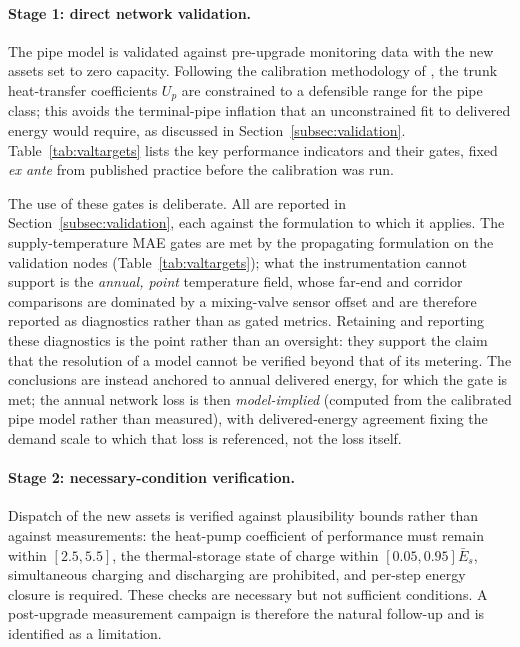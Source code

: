 \documentclass[a4paper,fleqn]{cas-sc}
\begin{document}
\paragraph{Stage 1: direct network validation.}
The pipe model is validated against pre-upgrade monitoring data with the new assets set to
zero capacity. Following the calibration methodology of \citet{Maldonado2024}, the trunk
heat-transfer coefficients $U_p$ are constrained to a defensible range for the pipe class;
this avoids the terminal-pipe inflation that an unconstrained fit to delivered energy would
require, as discussed in Section~\ref{subsec:validation}. Table~\ref{tab:valtargets} lists
the key performance indicators and their gates, fixed \emph{ex ante} from published practice
before the calibration was run.

The use of these gates is deliberate. All are reported in
Section~\ref{subsec:validation}, each against the formulation to which it applies. The
supply-temperature MAE gates are met by the propagating formulation on the validation nodes
(Table~\ref{tab:valtargets}); what the instrumentation cannot support is the \emph{annual,
point} temperature field, whose far-end and corridor comparisons are dominated by a
mixing-valve sensor offset and are therefore reported as diagnostics rather than as gated
metrics. Retaining and reporting these diagnostics is the point rather than an oversight:
they support the claim that the resolution of a model cannot be verified beyond that of its
metering. The conclusions are instead anchored to annual delivered energy, for which the gate
is met; the annual network loss is then \emph{model-implied} (computed from the calibrated
pipe model rather than measured), with delivered-energy agreement fixing the demand scale to
which that loss is referenced, not the loss itself.

\paragraph{Stage 2: necessary-condition verification.}
Dispatch of the new assets is verified against plausibility bounds rather than against
measurements: the heat-pump coefficient of performance must remain within \([2.5,5.5]\),
the thermal-storage state of charge within \([0.05,0.95]\bar{E}_s\), simultaneous charging
and discharging are prohibited, and per-step energy closure is required. These checks are
necessary but not sufficient conditions. A post-upgrade measurement campaign is therefore
the natural follow-up and is identified as a limitation.
\end{document}
